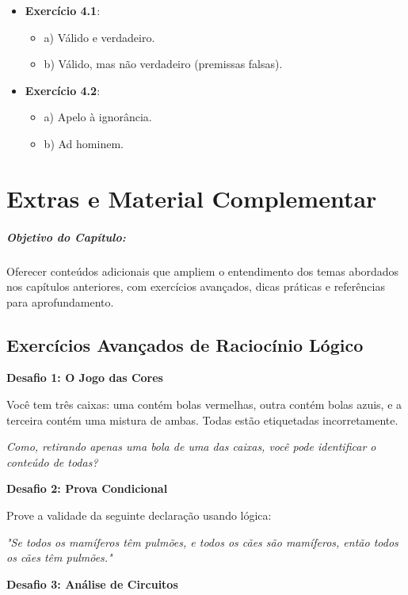 \documentclass[a4paper,12pt]{book}
\begin{document}
\begin{itemize}
    \item \textbf{Exercício 4.1}:
    \begin{itemize}
        \item a) Válido e verdadeiro.
        \item b) Válido, mas não verdadeiro (premissas falsas).
    \end{itemize}
    \item \textbf{Exercício 4.2}:
    \begin{itemize}
        \item a) Apelo à ignorância.
        \item b) Ad hominem.
    \end{itemize}
\end{itemize}


\chapter*{Extras e Material Complementar}

\paragraph{Objetivo do Capítulo:} Oferecer conteúdos adicionais que ampliem o entendimento dos temas abordados nos capítulos anteriores, com exercícios avançados, dicas práticas e referências para aprofundamento.

\section{Exercícios Avançados de Raciocínio Lógico}

\textbf{Desafio 1: O Jogo das Cores}

Você tem três caixas: uma contém bolas vermelhas, outra contém bolas azuis, e a terceira contém uma mistura de ambas. Todas estão etiquetadas incorretamente.

\textit{Como, retirando apenas uma bola de uma das caixas, você pode identificar o conteúdo de todas?}

\textbf{Desafio 2: Prova Condicional}

Prove a validade da seguinte declaração usando lógica:

\textit{"Se todos os mamíferos têm pulmões, e todos os cães são mamíferos, então todos os cães têm pulmões."}

\textbf{Desafio 3: Análise de Circuitos}
\end{document}
